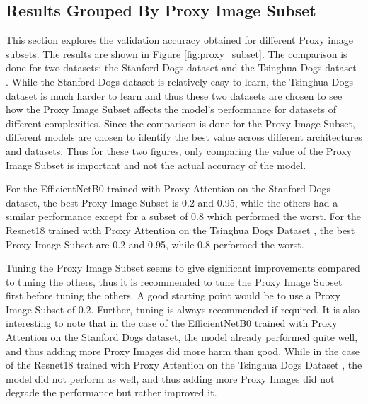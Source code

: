 \documentclass[a4paper,11pt,openright]{book}
\begin{document}
\subsection{Results Grouped By Proxy Image Subset}
This section explores the validation accuracy obtained for different Proxy image subsets. The results are shown in Figure \ref{fig:proxy_subset}.
The comparison is done for two datasets: the Stanford Dogs dataset \cite{khoslaNovelDatasetFineGrained} and the Tsinghua Dogs dataset \cite{zouNewDatasetDog2020}. While the Stanford Dogs dataset is relatively easy to learn, the Tsinghua Dogs dataset is much harder to learn and thus these two datasets are chosen to see how the Proxy Image Subset affects the model's performance for datasets of different complexities. Since the comparison is done for the Proxy Image Subset, different models are chosen to identify the best value across different architectures and datasets. Thus for these two figures, only comparing the value of the Proxy Image Subset is important and not the actual accuracy of the model.

For the EfficientNetB0 \cite{tanEfficientnetRethinkingModel2019} trained with Proxy Attention on the Stanford Dogs dataset\cite{khoslaNovelDatasetFineGrained}, the best Proxy Image Subset is 0.2 and 0.95, while the others had a similar performance except for a subset of 0.8 which performed the worst. For the Resnet18 \cite{heDeepResidualLearning2016} trained with Proxy Attention on the Tsinghua Dogs Dataset \cite{zouNewDatasetDog2020}, the best Proxy Image Subset are 0.2 and 0.95, while 0.8 performed the worst.

Tuning the Proxy Image Subset seems to give significant improvements compared to tuning the others, thus it is recommended to tune the Proxy Image Subset first before tuning the others. A good starting point would be to use a Proxy Image Subset of 0.2. Further, tuning is always recommended if required.
It is also interesting to note that in the case of the EfficientNetB0 \cite{tanEfficientnetRethinkingModel2019} trained with Proxy Attention on the Stanford Dogs dataset\cite{khoslaNovelDatasetFineGrained}, the model already performed quite well, and thus adding more Proxy Images did more harm than good. While in the case of the Resnet18 \cite{heDeepResidualLearning2016} trained with Proxy Attention on the Tsinghua Dogs Dataset \cite{zouNewDatasetDog2020}, the model did not perform as well, and thus adding more Proxy Images did not degrade the performance but rather improved it.
\end{document}
